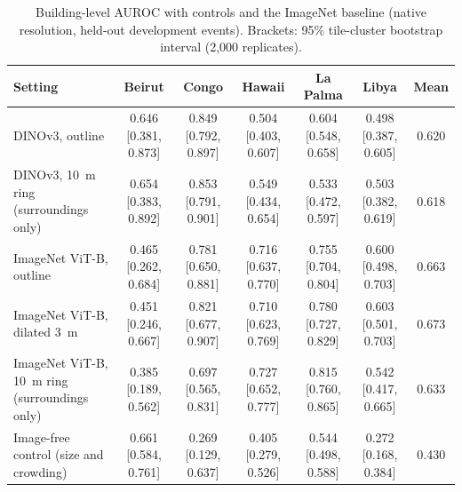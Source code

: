 \documentclass[journal]{IEEEtran}
\begin{document}
\begin{table}[t]
\centering
\caption{Building-level AUROC with controls and the ImageNet baseline (native resolution, held-out development events). Brackets: 95\% tile-cluster bootstrap interval (2,000 replicates).}
\label{tab:controls}
\scriptsize
\setlength{\tabcolsep}{3pt}
\begin{tabular}{@{}lcccccc@{}}
\toprule
Setting & Beirut & Congo & Hawaii & La Palma & Libya & Mean \\
\midrule
DINOv3, outline & 0.646 [0.381, 0.873] & 0.849 [0.792, 0.897] & 0.504 [0.403, 0.607] & 0.604 [0.548, 0.658] & 0.498 [0.387, 0.605] & 0.620 \\
DINOv3, 10~m ring (surroundings only) & 0.654 [0.383, 0.892] & 0.853 [0.791, 0.901] & 0.549 [0.434, 0.654] & 0.533 [0.472, 0.597] & 0.503 [0.382, 0.619] & 0.618 \\
ImageNet ViT-B, outline & 0.465 [0.262, 0.684] & 0.781 [0.650, 0.881] & 0.716 [0.637, 0.770] & 0.755 [0.704, 0.804] & 0.600 [0.498, 0.703] & 0.663 \\
ImageNet ViT-B, dilated 3~m & 0.451 [0.246, 0.667] & 0.821 [0.677, 0.907] & 0.710 [0.623, 0.769] & 0.780 [0.727, 0.829] & 0.603 [0.501, 0.703] & 0.673 \\
ImageNet ViT-B, 10~m ring (surroundings only) & 0.385 [0.189, 0.562] & 0.697 [0.565, 0.831] & 0.727 [0.652, 0.777] & 0.815 [0.760, 0.865] & 0.542 [0.417, 0.665] & 0.633 \\
Image-free control (size and crowding) & 0.661 [0.584, 0.761] & 0.269 [0.129, 0.637] & 0.405 [0.279, 0.526] & 0.544 [0.498, 0.588] & 0.272 [0.168, 0.384] & 0.430 \\
\bottomrule
\end{tabular}
\end{table}

\begin{table}[t]
\centering
\caption{Event-level comparisons with controls and the ImageNet baseline (5 events, 95\% t-interval; $p$: exact sign-flip test, smallest attainable 0.0625).}
\label{tab:cmp2}
\footnotesize
{}
\end{table}
\end{document}
